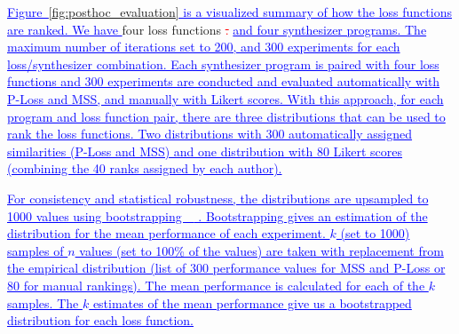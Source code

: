 \documentclass[lettersize,journal]{IEEEtran}
\makeatletter
\renewcommand{\DIFadd}[1]{\textcolor{blue}{\uline{#1}}}
\renewcommand{\DIFdel}[1]{\textcolor{red}{\sout{#1}}}
\providecommand{\DIFadd}[1]{{\protect\color{blue}\uwave{#1}}} %
\providecommand{\DIFdel}[1]{{\protect\color{red}\sout{#1}}} %
\providecommand{\DIFaddbegin}{} %
\providecommand{\DIFaddend}{} %
\providecommand{\DIFdelbegin}{} %
\providecommand{\DIFdelend}{} %
\providecommand{\DIFscaledelfig}{0.5}
\newlength{\DIFdelgraphicswidth} %
\newlength{\DIFdelgraphicsheight} %
\providecommand{\DIFaddincludegraphics}[2][]{{\color{blue}\fbox{\DIFOincludegraphics[#1]{#2}}}} %
\providecommand{\DIFdelincludegraphics}[2][]{%
\sbox{\DIFdelgraphicsbox}{\DIFOincludegraphics[#1]{#2}}%
\settoboxwidth{\DIFdelgraphicswidth}{\DIFdelgraphicsbox} %
\settoboxtotalheight{\DIFdelgraphicsheight}{\DIFdelgraphicsbox} %
\scalebox{\DIFscaledelfig}{%
\parbox[b]{\DIFdelgraphicswidth}{\usebox{\DIFdelgraphicsbox}\\[-\baselineskip] \rule{\DIFdelgraphicswidth}{0em}}\llap{\resizebox{\DIFdelgraphicswidth}{\DIFdelgraphicsheight}{%
\setlength{\unitlength}{\DIFdelgraphicswidth}%
\begin{picture}(1,1)%
\thicklines\linethickness{2pt} %
{\color[rgb]{1,0,0}\put(0,0){\framebox(1,1){}}}%
{\color[rgb]{1,0,0}\put(0,0){\line( 1,1){1}}}%
{\color[rgb]{1,0,0}\put(0,1){\line(1,-1){1}}}%
\end{picture}%
}\hspace*{3pt}}} %
} %
\DeclareRobustCommand{\DIFaddbegin}{\DIFOaddbegin \let\includegraphics\DIFaddincludegraphics} %
\DeclareRobustCommand{\DIFaddend}{\DIFOaddend \let\includegraphics\DIFOincludegraphics} %
\DeclareRobustCommand{\DIFdelbegin}{\DIFOdelbegin \let\includegraphics\DIFdelincludegraphics} %
\DeclareRobustCommand{\DIFdelend}{\DIFOaddend \let\includegraphics\DIFOincludegraphics} %
\let\sout@orig\sout %
\renewcommand{\sout}[1]{\ifmmode\text{\sout@orig{\ensuremath{#1}}}\else\sout@orig{#1}\fi} %
\makeatother
\begin{document}

 \DIFadd{Figure~\ref{fig:posthoc_evaluation} is a visualized summary of how the loss functions are ranked. We have }\DIFaddend four loss functions \DIFdelbegin \DIFdel{. }\DIFdelend \DIFaddbegin \DIFadd{and four synthesizer programs. The maximum number of iterations set to 200, and 300 experiments for each loss/synthesizer combination. Each synthesizer program is paired with four loss functions and 300 experiments are conducted and evaluated automatically with P-Loss and MSS, and manually with Likert scores. With this approach, for each program and loss function pair, there are three distributions that can be used to rank the loss functions. Two distributions with 300 automatically assigned similarities (P-Loss and MSS) and one distribution with 80 Likert scores (combining the 40 ranks assigned by each author).
}

\DIFadd{For consistency and statistical robustness, the distributions are upsampled to 1000 values using bootstrapping~\mbox{%
\cite{tibshirani1993introduction}}\hskip0pt%
. Bootstrapping gives an estimation of the distribution for the mean performance of each experiment. $k$ (set to 1000) samples of $n$ values (set to 100\% of the values) are taken with replacement from the empirical distribution (list of 300 performance values for MSS and P-Loss or 80 for manual rankings). The mean performance is calculated for each of the $k$ samples. The $k$ estimates of the mean performance give us a bootstrapped distribution for each loss function. 
}
\end{document}
